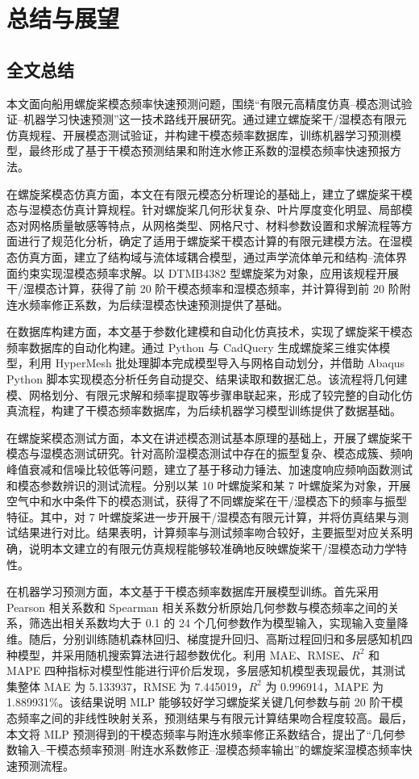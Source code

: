 \chapter{总结与展望}

\section{全文总结}

本文面向船用螺旋桨模态频率快速预测问题，围绕“有限元高精度仿真--模态测试验证--机器学习快速预测”这一技术路线开展研究。通过建立螺旋桨干/湿模态有限元仿真规程、开展模态测试验证，并构建干模态频率数据库，训练机器学习预测模型，最终形成了基于干模态预测结果和附连水修正系数的湿模态频率快速预报方法。

在螺旋桨模态仿真方面，本文在有限元模态分析理论的基础上，建立了螺旋桨干模态与湿模态仿真计算规程。针对螺旋桨几何形状复杂、叶片厚度变化明显、局部模态对网格质量敏感等特点，从网格类型、网格尺寸、材料参数设置和求解流程等方面进行了规范化分析，确定了适用于螺旋桨干模态计算的有限元建模方法。在湿模态仿真方面，建立了结构域与流体域耦合模型，通过声学流体单元和结构--流体界面约束实现湿模态频率求解。以 DTMB4382 型螺旋桨为对象，应用该规程开展干/湿模态计算，获得了前 20 阶干模态频率和湿模态频率，并计算得到前 20 阶附连水频率修正系数，为后续湿模态快速预测提供了基础。

在数据库构建方面，本文基于参数化建模和自动化仿真技术，实现了螺旋桨干模态频率数据库的自动化构建。通过 Python 与 CadQuery 生成螺旋桨三维实体模型，利用 HyperMesh 批处理脚本完成模型导入与网格自动划分，并借助 Abaqus Python 脚本实现模态分析任务自动提交、结果读取和数据汇总。该流程将几何建模、网格划分、有限元求解和频率提取等步骤串联起来，形成了较完整的自动化仿真流程，构建了干模态频率数据库，为后续机器学习模型训练提供了数据基础。

在螺旋桨模态测试方面，本文在讲述模态测试基本原理的基础上，开展了螺旋桨干模态与湿模态测试研究。针对高阶湿模态测试中存在的振型复杂、模态成簇、频响峰值衰减和信噪比较低等问题，建立了基于移动力锤法、加速度响应频响函数测试和模态参数辨识的测试流程。分别以某 10 叶螺旋桨和某 7 叶螺旋桨为对象，开展空气中和水中条件下的模态测试，获得了不同螺旋桨在干/湿模态下的频率与振型特征。其中，对 7 叶螺旋桨进一步开展干/湿模态有限元计算，并将仿真结果与测试结果进行对比。结果表明，计算频率与测试频率吻合较好，主要振型对应关系明确，说明本文建立的有限元仿真规程能够较准确地反映螺旋桨干/湿模态动力学特性。

在机器学习预测方面，本文基于干模态频率数据库开展模型训练。首先采用 Pearson 相关系数和 Spearman 相关系数分析原始几何参数与模态频率之间的关系，筛选出相关系数均大于 0.1 的 24 个几何参数作为模型输入，实现输入变量降维。随后，分别训练随机森林回归、梯度提升回归、高斯过程回归和多层感知机四种模型，并采用随机搜索算法进行超参数优化。利用 MAE、RMSE、$R^2$ 和 MAPE 四种指标对模型性能进行评价后发现，多层感知机模型表现最优，其测试集整体 MAE 为 5.133937，RMSE 为 7.445019，$R^2$ 为 0.996914，MAPE 为 1.889931\%。该结果说明 MLP 能够较好学习螺旋桨关键几何参数与前 20 阶干模态频率之间的非线性映射关系，预测结果与有限元计算结果吻合程度较高。最后，本文将 MLP 预测得到的干模态频率与附连水频率修正系数结合，提出了“几何参数输入--干模态频率预测--附连水系数修正--湿模态频率输出”的螺旋桨湿模态频率快速预测流程。

